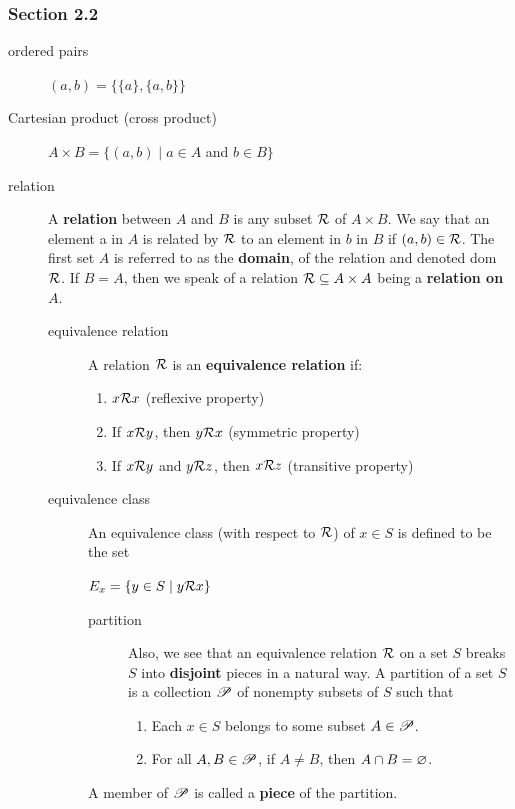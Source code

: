 \documentclass[12pt]{article}
\begin{document}
\subsubsection{Section 2.2}
\label{sec:org63a44fd}
\begin{description}
\item[{ordered pairs}] \((a,b)=\{\{a\},\{a,b\}\}\)
\item[{Cartesian product (cross product)}] \(A\times{}B=\{(a,b)\mid{}a\in{}A\) and \(b\in{}B\}\)
\item[{relation}] A \textbf{relation} between \(A\) and \(B\) is any subset \(\mathcal{R}\) of \(A\times{}B\). We say
that an element a in \(A\) is related by \(\mathcal{R}\) to an element in \(b\) in
\(B\) if \((a,b)\in{}\mathcal{R}\). The first set \(A\) is referred to as the \textbf{domain},
of the relation and denoted dom \(\mathcal{R}\). If \(B=A\), then we speak of a
relation \(\mathcal{R}\subseteq{}A\times{}A\) being a \textbf{relation on} \(A\).
\begin{description}
\item[{equivalence relation}] A relation \(\mathcal{R}\) is an \textbf{equivalence relation} if:
\begin{enumerate}
\item \(x\mathcal{R}{}x\) \hfill (reflexive property)
\item If \(x\mathcal{R}{}y\), then \(y\mathcal{R}{}x\) \hfill (symmetric property)
\item If \(x\mathcal{R}{}y\) and \(y\mathcal{R}{}z\), then \(x\mathcal{R}{}z\) \hfill (transitive property)
\end{enumerate}
\item[{equivalence class}] An equivalence class (with respect to \(\mathcal{R}\)) of \(x\in{}S\) is
defined to be the set
\begin{center}
\(E_{x}=\{y\in{}S\mid{}y\mathcal{R}{}x\}\)
\end{center}
\begin{description}
\item[{partition}] Also, we see that an equivalence relation \(\mathcal{R}\) on a set \(S\)
breaks \(S\) into \textbf{disjoint} pieces in a natural way. A partition
of a set \(S\) is a collection \(\mathscr{P}\) of nonempty subsets of
\(S\) such that
\begin{enumerate}
\item Each \(x\in{}S\) belongs to some subset \(A\in\mathscr{P}\).
\item For all \(A,B\in\mathscr{P}\), if \(A\ne{}B\), then \(A\cap{}B=\varnothing\).
\end{enumerate}
\end{description}
A member of \(\mathscr{P}\) is called a \textbf{piece} of the partition.
\end{description}
\end{description}
\end{document}

